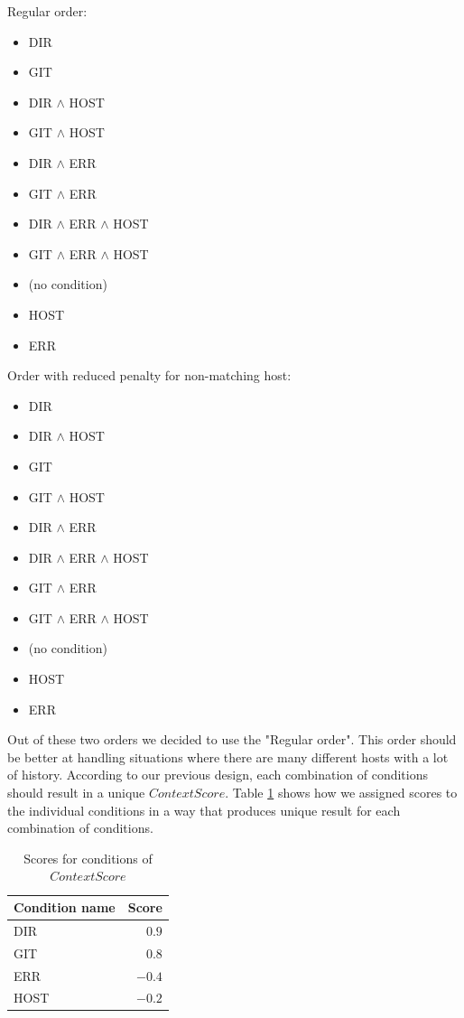 \begin{multicols}{2}[]
Regular order:
\begin{itemize}
    \item DIR
    \item GIT
    \item DIR \(\wedge\) HOST
    \item GIT \(\wedge\) HOST
    \item DIR \(\wedge\) ERR
    \item GIT \(\wedge\) ERR
    \item DIR \(\wedge\) ERR \(\wedge\) HOST 
    \item GIT \(\wedge\) ERR \(\wedge\) HOST
    \item (no condition)
    \item HOST
    \item ERR
\end{itemize}

Order with reduced penalty for non-matching host:
\begin{itemize}
    \item DIR
    \item DIR \(\wedge\) HOST
    \item GIT
    \item GIT \(\wedge\) HOST
    \item DIR \(\wedge\) ERR
    \item DIR \(\wedge\) ERR \(\wedge\) HOST
    \item GIT \(\wedge\) ERR
    \item GIT \(\wedge\) ERR \(\wedge\) HOST
    \item (no condition)
    \item HOST
    \item ERR
\end{itemize}
\end{multicols}

Out of these two orders we decided to use the "Regular order". This order should be better at handling situations where there are many different hosts with a lot of history. According to our previous design, each combination of conditions should result in a unique \(ContextScore\). Table \ref{tab:score-context-impl-values} shows how we assigned scores to the individual conditions in a way that produces unique result for each combination of conditions.

\begin{table}[h!]
\centering
\begin{tabular}{lr}
\hline \hline
Condition name & Score \\
\hline
DIR         & \(0.9\)   \\ 
GIT         & \(0.8\)   \\ 
ERR         & \(-0.4\)     \\
HOST        & \(-0.2\)     \\ 
\hline \hline
\end{tabular}
\caption{Scores for conditions of \(ContextScore\)}
\label{tab:score-context-impl-values}
\end{table}

